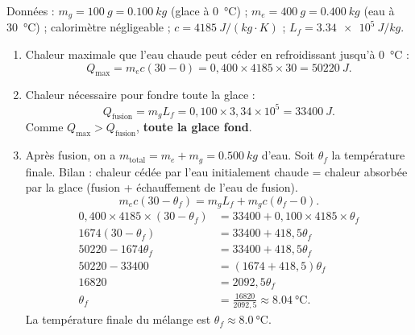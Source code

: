 \documentclass[11pt]{article}
\begin{document}
\begin{corrige}
Données : $m_g = \SI{100}{g} = \SI{0,100}{kg}$ (glace à \SI{0}{\degreeCelsius}) ; $m_e = \SI{400}{g} = \SI{0,400}{kg}$ (eau à \SI{30}{\degreeCelsius}) ; calorimètre négligeable ; $c = \SI{4185}{J/(kg\cdot K)}$ ; $L_f = \SI{3,34e5}{J/kg}$.
\begin{enumerate}
\item Chaleur maximale que l'eau chaude peut céder en refroidissant jusqu'à \SI{0}{\degreeCelsius} :
  \[
  Q_{\text{max}} = m_e c (30 - 0) = 0,400 \times 4185 \times 30 = \SI{50220}{J}.
  \]
\item Chaleur nécessaire pour fondre toute la glace :
  \[
  Q_{\text{fusion}} = m_g L_f = 0,100 \times 3,34 \times 10^5 = \SI{33400}{J}.
  \]
  Comme $Q_{\text{max}} > Q_{\text{fusion}}$, \textbf{toute la glace fond}.
\item Après fusion, on a $m_{\text{total}} = m_e + m_g = \SI{0,500}{kg}$ d'eau. Soit $\theta_f$ la température finale.
  Bilan : chaleur cédée par l'eau initialement chaude = chaleur absorbée par la glace (fusion + échauffement de l'eau de fusion).
  \[
  m_e c (30 - \theta_f) = m_g L_f + m_g c (\theta_f - 0).
  \]
  \begin{align*}
  0,400 \times 4185 \times (30 - \theta_f) &= 33400 + 0,100 \times 4185 \times \theta_f \\
  1674 (30 - \theta_f) &= 33400 + 418,5 \theta_f \\
  50220 - 1674 \theta_f &= 33400 + 418,5 \theta_f \\
  50220 - 33400 &= (1674 + 418,5) \theta_f \\
  16820 &= 2092,5 \theta_f \\
  \theta_f &= \frac{16820}{2092,5} \approx \SI{8,04}{\degreeCelsius}.
  \end{align*}
  La température finale du mélange est \textbf{$\theta_f \approx \SI{8,0}{\degreeCelsius}$}.
\end{enumerate}
\end{corrige}
\end{document}
